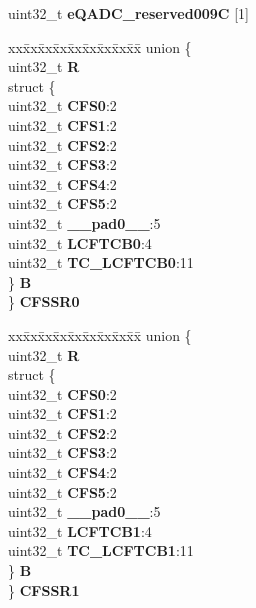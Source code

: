 \begin{DoxyCompactItemize}
\begin{tabbing}
\end{tabbing}\item 
\mbox{\label{structEQADC__tag_a25e6a38a44e1e2bd6f6061793602c1fd}} 
uint32\+\_\+t {\bfseries e\+Q\+A\+D\+C\+\_\+reserved009C} \mbox{[}1\mbox{]}
\item 
\mbox{\label{structEQADC__tag_a0ebeb280ac6dd84fe3e51a5a210d99ae}} 
\begin{tabbing}
xx\=xx\=xx\=xx\=xx\=xx\=xx\=xx\=xx\=\kill
union \{\\
\>uint32\_t {\bfseries R}\\
\>struct \{\\
\>\>uint32\_t {\bfseries CFS0}:2\\
\>\>uint32\_t {\bfseries CFS1}:2\\
\>\>uint32\_t {\bfseries CFS2}:2\\
\>\>uint32\_t {\bfseries CFS3}:2\\
\>\>uint32\_t {\bfseries CFS4}:2\\
\>\>uint32\_t {\bfseries CFS5}:2\\
\>\>uint32\_t {\bfseries \_\_pad0\_\_}:5\\
\>\>uint32\_t {\bfseries LCFTCB0}:4\\
\>\>uint32\_t {\bfseries TC\_LCFTCB0}:11\\
\>\} {\bfseries B}\\
\} {\bfseries CFSSR0}\\

\end{tabbing}\item 
\mbox{\label{structEQADC__tag_a3914612a28fc9a6e228c410808e9f473}} 
\begin{tabbing}
xx\=xx\=xx\=xx\=xx\=xx\=xx\=xx\=xx\=\kill
union \{\\
\>uint32\_t {\bfseries R}\\
\>struct \{\\
\>\>uint32\_t {\bfseries CFS0}:2\\
\>\>uint32\_t {\bfseries CFS1}:2\\
\>\>uint32\_t {\bfseries CFS2}:2\\
\>\>uint32\_t {\bfseries CFS3}:2\\
\>\>uint32\_t {\bfseries CFS4}:2\\
\>\>uint32\_t {\bfseries CFS5}:2\\
\>\>uint32\_t {\bfseries \_\_pad0\_\_}:5\\
\>\>uint32\_t {\bfseries LCFTCB1}:4\\
\>\>uint32\_t {\bfseries TC\_LCFTCB1}:11\\
\>\} {\bfseries B}\\
\} {\bfseries CFSSR1}\\


\end{tabbing}
\end{DoxyCompactItemize}
